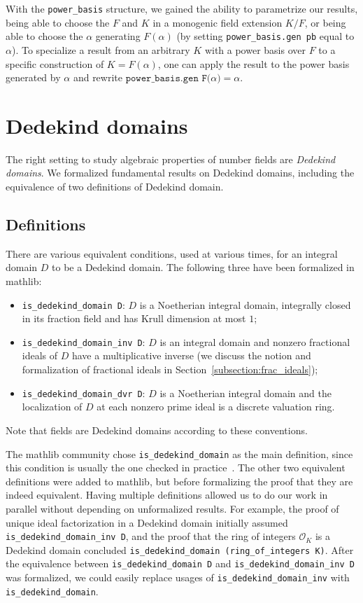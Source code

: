 \documentclass[sn-mathphys]{sn-jnl}%
\newcommand{\lean}[1]{\texttt{#1}\xspace}
\newcommand*{\OK}[1][K]{\mathcal{O}_{#1}}
\newcommand{\mathlib}{\textsf{mathlib}\xspace}
\begin{document}
With the \lean{power\_basis} structure, we gained the ability to parametrize our results,
being able to choose the $F$ and $K$ in a monogenic field extension $K / F$, or being able to choose the $\alpha$ generating $F(\alpha)$ (by setting \lean{power\_basis.gen\ pb} equal to $\alpha$).
To specialize a result from an arbitrary $K$ with a power basis over $F$ to a specific construction of $K = F(\alpha)$,
one can apply the result to the power basis generated by $\alpha$ and rewrite $\lean{power\_basis.gen F($\alpha$)} = \alpha$.


\section{Dedekind domains} \label{sec:Dedekind-domain}
The right setting to study algebraic properties of number fields are \emph{Dedekind domains}.
We formalized fundamental results on Dedekind domains, including the equivalence of two definitions of Dedekind domain.

\subsection{Definitions}\label{subsec:definitions_DD}
There are various equivalent conditions, used at various times, for an integral domain $D$ to be a Dedekind domain.
The following three have been formalized in \mathlib:
\begin{itemize}
\item \lean{is\_dedekind\_domain D}: $D$ is a Noetherian integral domain, integrally closed in its fraction field and has Krull dimension at most $1$;
\item \lean{is\_dedekind\_domain\_inv D}: $D$ is an integral domain and nonzero fractional ideals of $D$ have a multiplicative inverse (we discuss the notion and formalization of fractional ideals in Section~\ref{subsection:frac_ideals});
\item \lean{is\_dedekind\_domain\_dvr D}: $D$ is a Noetherian integral domain and the localization of $D$ at each nonzero prime ideal is a discrete valuation ring.
\end{itemize}
Note that fields are Dedekind domains according to these conventions.

The mathlib community chose \lean{is\_dedekind\_domain} as the main definition,
since this condition is usually the one checked in practice~\cite{Neukirch}.
The other two equivalent definitions were added to \mathlib, but before formalizing the proof that they are indeed equivalent.
Having multiple definitions allowed us to do our work in parallel without depending on unformalized results.
For example,
the proof of unique ideal factorization in a Dedekind domain initially assumed \lean{is\_dedekind\_domain\_inv D},
and the proof that the ring of integers $\OK$ is a Dedekind domain concluded \lean{is\_dedekind\_domain (ring\_of\_integers K)}.
After the equivalence between \lean{is\_dedekind\_domain D} and \lean{is\_dedekind\_domain\_inv D} was formalized,
we could easily replace usages of \lean{is\_dedekind\_domain\_inv} with \lean{is\_dedekind\_domain}.
\end{document}
